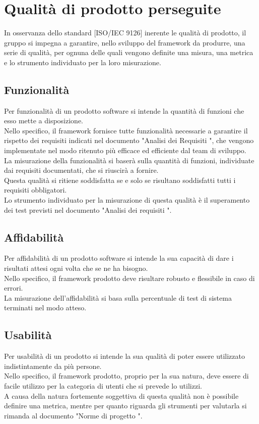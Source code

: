 
\section{Qualità di prodotto perseguite}
	In osservanza dello standard [ISO/IEC 9126] inerente le qualità di prodotto, il gruppo \groupname si impegna a garantire, nello sviluppo del framework da produrre, una serie di qualità, per ognuna delle quali vengono definite una misura, una metrica e lo strumento individuato per la loro misurazione.
	\subsection{Funzionalità}
		Per funzionalità di un prodotto software si intende la quantità di funzioni che esso mette a disposizione.\\
		Nello specifico, il framework fornisce tutte funzionalità necessarie a garantire il rispetto dei requisiti indicati nel documento "Analisi dei Requisiti \lastversion", che vengono implementate nel modo ritenuto più efficace ed efficiente dal team di sviluppo.\\
		La misurazione della funzionalità si baserà sulla quantità di funzioni, individuate dai requisiti documentati, che si riuscirà a fornire.\\
		Questa qualità si ritiene soddisfatta se e solo se risultano soddisfatti tutti i requisiti obbligatori.\\
		Lo strumento individuato per la misurazione di questa qualità è il superamento dei test previsti nel documento "Analisi dei requisiti \lastversion".
	\subsection{Affidabilità}
		Per affidabilità di un prodotto software si intende la sua capacità di dare i risultati attesi ogni volta che se ne ha bisogno.\\
		Nello specifico, il framework prodotto deve risultare robusto e flessibile in caso di errori.\\
		La misurazione dell'affidabilità si basa sulla percentuale di test di sistema terminati nel modo atteso.
	\subsection{Usabilità}
		Per usabilità di un prodotto si intende la sua qualità di poter essere utilizzato indistintamente da più persone.\\
		Nello specifico, il framework prodotto, proprio per la sua natura, deve essere di facile utilizzo per la categoria di utenti che si prevede lo utilizzi.\\
		A causa della natura fortemente soggettiva di questa qualità non è possibile definire una metrica, mentre per quanto riguarda gli strumenti per valutarla si rimanda al documento "Norme di progetto \lastversion".
